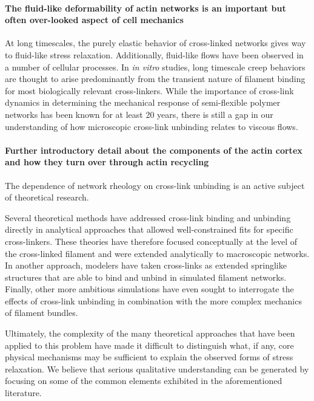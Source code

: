 \documentclass[10pt,letterpaper]{article}
\begin{document}
\paragraph{The fluid-like deformability of actin networks is an important but often over-looked aspect of cell mechanics}

At long timescales, the purely elastic behavior of cross-linked networks gives way to fluid-like stress relaxation. Additionally, fluid-like flows have been observed in a number of cellular processes\cite{cellmech_flows,cellmech_flows2,cellmech_flows3,rheo_fluid,rheo_fluid2,cell_rheo_exp}.  In {\em in vitro} studies, long timescale creep behaviors are thought to arise predominantly from the transient nature of filament binding for most biologically relevant cross-linkers\cite{rheo_crosslinkslip1,rheo_crosslinkslip2,rheo_crosslinkslip3,rheo_nonaffine}.  While the importance of cross-link dynamics in determining the mechanical response of semi-flexible polymer networks has been known for at least 20 years\cite{rheo_crosslinksmatter}, there is still a gap in our understanding of how microscopic cross-link unbinding relates to viscous flows. 

\paragraph{Further introductory detail about the components of the actin cortex and how they turn over through actin recycling}
The dependence of network rheology on cross-link unbinding is an active subject of theoretical research\cite{theo_crosslinkslip2}.  

Several theoretical methods have addressed cross-link binding and unbinding directly \cite{theo_crosslinkslip1,theo_crosslinkslip2} in analytical approaches that allowed well-constrained fits for specific cross-linkers.  These theories have therefore focused conceptually at the level of the cross-linked filament and were extended analytically to macroscopic networks.  In another approach, modelers have taken cross-links as extended springlike structures \cite{model_taeyoon} that are able to bind and unbind in simulated filament networks. Finally, other more ambitious simulations have even sought to interrogate the effects of cross-link unbinding in combination with the more complex mechanics of filament bundles\cite{rheo_crosslinkslip2,theo_crosslinkslip3}.

Ultimately, the complexity of the many theoretical approaches that have been applied to this problem have made it difficult to distinguish what, if any, core physical mechanisms may be sufficient to explain the observed forms of stress relaxation.  We believe that serious qualitative understanding can be generated by focusing on some of the common elements exhibited in the aforementioned literature.
\end{document}
